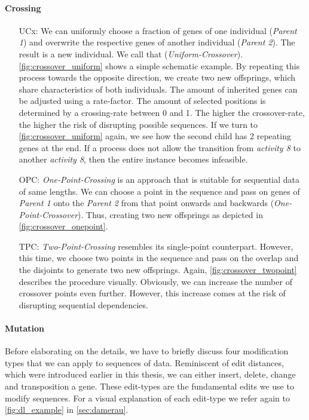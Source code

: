 \documentclass[./../../paper.tex]{subfiles}
\begin{document}
\paragraph{Crossing}
\begin{enumerate}
    \item[UCx:] We can uniformly choose a fraction of genes of one individual (\emph{Parent 1}) and overwrite the respective genes of another individual (\emph{Parent 2}). The result is a new individual. We call that (\emph{Uniform-Crossover}).
          \autoref{fig:crossover_uniform} shows a simple schematic example. By repeating this process towards the opposite direction, we create two new offsprings, which share characteristics of both individuals.
          The amount of inherited genes can be adjusted using a rate-factor. The amount of selected positions is determined by a crossing-rate between 0 and 1. The higher the crossover-rate, the higher the risk of disrupting possible sequences. If we turn to \autoref{fig:crossover_uniform} again, we see how the second child has 2 repeating genes at the end. If a process does not allow the transition from \emph{activity 8} to another \emph{activity 8}, then the entire \gls{instance} becomes infeasible.
    \item[OPC:] \emph{One-Point-Crossing} is an approach that is suitable for sequential data of same lengths. We can choose a point in the sequence and pass on genes of \emph{Parent 1} onto the \emph{Parent 2} from that point onwards and backwards (\emph{One-Point-Crossover}).
          Thus, creating two new offsprings as depicted in \autoref{fig:crossover_onepoint}.
    \item[TPC:] \emph{Two-Point-Crossing} resembles its single-point counterpart. However, this time, we choose two points in the sequence and pass on the overlap and the disjoints to generate two new offsprings. Again, \autoref{fig:crossover_twopoint} describes the procedure visually. Obviously, we can increase the number of crossover points even further. However, this increase comes at the risk of disrupting sequential dependencies.
\end{enumerate}







\paragraph{Mutation}
Before elaborating on the details, we have to briefly discuss four modification types that we can apply to sequences of data. Reminiscent of edit distances, which were introduced earlier in this thesis, we can either insert, delete, change and transposition a gene. These edit-types are the fundamental edits we use to modify sequences. For a visual explanation of each edit-type we refer again to \autoref{fig:dl_example} in \autoref{sec:damerau}.
\end{document}
